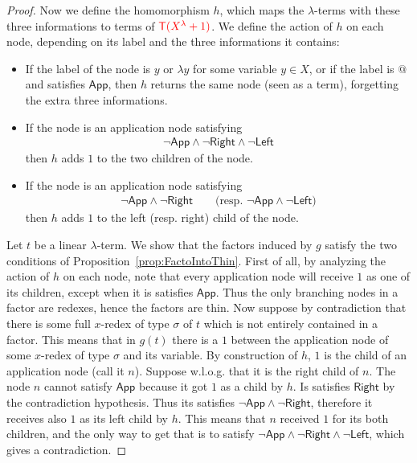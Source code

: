 \begin{proof}
Now we define the homomorphism $h$, which maps the $\lambda$-terms with these three informations to terms of ${\color{red}{{\color{red}{\mathsf T}}({\color{red}{X^\lambda}}+1)}}$. We define the action of $h$ on each node, depending on its label and the three informations it contains:
\begin{itemize}
\item If the label of the node is $y$ or $\lambda y$ for some variable $y\in X$, or if the label is $@$ and satisfies $\mathsf{App}$, then $h$ returns the same node (seen as a term), forgetting the extra three informations.
\item If the node is an application node satisfying 
\begin{align*}
\neg \mathsf{App} \wedge \neg \mathsf{Right} \wedge\neg \mathsf{Left} 
\end{align*} 
then $h$ adds $1$ to the two children of the node.
\item If the node is an application node satisfying 
\begin{align*}
\neg \mathsf{App} \wedge \neg \mathsf{Right} \qquad\text{(resp. } \neg \mathsf{App} \wedge \neg \mathsf{Left} \text{)}
\end{align*} 
then $h$ adds $1$ to the left (resp. right) child of the node. 
\end{itemize}
Let $t$ be a linear $\lambda$-term. We show that the factors induced by $g$ satisfy the two conditions of Proposition~\ref{prop:FactoIntoThin}. First of all, by analyzing the action of $h$ on each node, note that every application node will receive $1$ as one of its children, except when it is satisfies $\mathsf{App}$. Thus the only branching nodes in a factor are redexes, hence the factors are thin. Now suppose by contradiction that there is some full $x$-redex of type $\sigma$ of $t$ which is not entirely contained in a factor. This means that in $g(t)$ there is a $1$ between the application node of some $x$-redex of type $\sigma$ and its variable.
By construction of $h$, $1$ is the child of an application node (call it $n$). Suppose w.l.o.g. that it is the right child of $n$. The node $n$ cannot satisfy $\mathsf{App}$ because it got $1$ as a child by $h$. Is satisfies $\mathsf{Right}$ by the contradiction hypothesis. Thus its satisfies $\neg \mathsf{App} \wedge \neg \mathsf{Right}$, therefore it receives also $1$ as its left child by $h$. This means that $n$ received $1$ for its both children, and the only way to get that is to satisfy $\neg \mathsf{App} \wedge \neg \mathsf{Right} \wedge\neg \mathsf{Left}$, which gives a contradiction. 
\end{proof}
